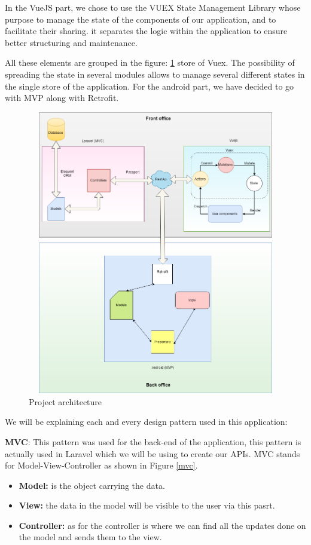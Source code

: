 \documentclass[12pt,a4paper]{report}
\begin{document}
	In the
	VueJS part, we chose to use the VUEX State Management Library whose purpose
	to manage the state of the components of our application, and to facilitate their sharing.
	it separates the logic within the application to ensure better structuring and maintenance.
	\par

All these elements are grouped in the figure: \ref{label-archi} store of Vuex. The possibility of spreading
the state in several modules allows to manage several different states in the single store of
the application. For the android part, we have decided to go with MVP along with Retrofit.\par
\begin{figure}[H]
	\centering
	\includegraphics[width=5.5in,height=4.9in]{archi.png}
	\caption{Project architecture}
	\label{label-archi}
\end{figure}
 We will be explaining each and every design pattern used in this application:\par
\textbf{MVC}: This pattern was used for the back-end of the application, this pattern is actually used in Laravel which we will be using to create our APIs. MVC stands for Model-View-Controller as shown in Figure \ref{mvc}. \cite{mvc}\par 
\begin{itemize}
	\item \textbf{Model:} is the object carrying the data.
	\item \textbf{View:} the data in the model will be visible to the user via this pasrt.
	\item \textbf{Controller:} as for the controller is where we can find all the updates done on the model and sends them to the view.
\end{itemize}
\end{document}
